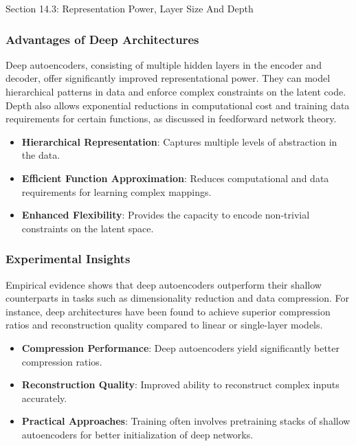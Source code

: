 \begin{notes}{Section 14.3: Representation Power, Layer Size And Depth}
    \subsubsection*{Advantages of Deep Architectures}
    
    Deep autoencoders, consisting of multiple hidden layers in the encoder and decoder, offer significantly improved representational power. They can model hierarchical patterns in data and enforce complex 
    constraints on the latent code. Depth also allows exponential reductions in computational cost and training data requirements for certain functions, as discussed in feedforward network theory.
    
    \begin{highlight}
        \begin{itemize}
            \item \textbf{Hierarchical Representation}: Captures multiple levels of abstraction in the data.
            \item \textbf{Efficient Function Approximation}: Reduces computational and data requirements for learning complex mappings.
            \item \textbf{Enhanced Flexibility}: Provides the capacity to encode non-trivial constraints on the latent space.
        \end{itemize}
    \end{highlight}
    
    \subsubsection*{Experimental Insights}
    
    Empirical evidence shows that deep autoencoders outperform their shallow counterparts in tasks such as dimensionality reduction and data compression. For instance, deep architectures have been found to 
    achieve superior compression ratios and reconstruction quality compared to linear or single-layer models.
    
    \begin{highlight}
        \begin{itemize}
            \item \textbf{Compression Performance}: Deep autoencoders yield significantly better compression ratios.
            \item \textbf{Reconstruction Quality}: Improved ability to reconstruct complex inputs accurately.
            \item \textbf{Practical Approaches}: Training often involves pretraining stacks of shallow autoencoders for better initialization of deep networks.
        \end{itemize}
    \end{highlight}
    

\end{notes}
